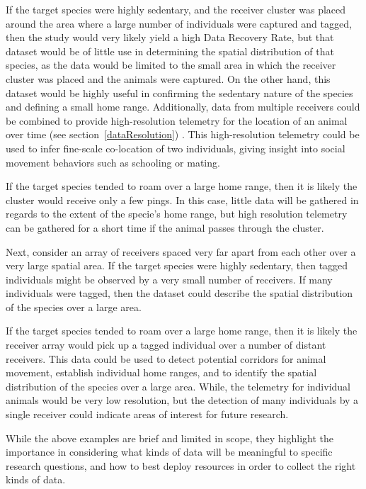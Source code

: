 If the target species were highly sedentary, and the receiver cluster was placed around the area where a large number of individuals were captured and tagged, then the study would very likely yield a high Data Recovery Rate, but that dataset would be of little use in determining the spatial distribution of that species, as the data would be limited to the small area in which the receiver cluster was placed and the animals were captured.  On the other hand, this dataset would be highly useful in confirming the sedentary nature of the species and defining a small home range.  Additionally, data from multiple receivers could be combined to provide high-resolution telemetry for the location of an animal over time (see section~\ref{dataResolution}) \cite{Heupel2006}.  This high-resolution telemetry could be used to infer fine-scale co-location of two individuals, giving insight into social movement behaviors such as schooling or mating.  

If the target species tended to roam over a large home range, then it is likely the cluster would receive only a few pings.  In this case, little data will be gathered in regards to the extent of the specie's home range, but high resolution telemetry can be gathered for a short time if the animal passes through the cluster.

Next, consider an array of receivers spaced very far apart from each other over a very large spatial area.
If the target species were highly sedentary, then tagged individuals might be observed by a very small number of receivers.  If many individuals were tagged, then the dataset could describe the spatial distribution of the species over a large area.

If the target species tended to roam over a large home range, then it is likely the receiver array would pick up a tagged individual over a number of distant receivers.  This data could be used to detect potential corridors for animal movement, establish individual home ranges, and to identify the spatial distribution of the species over a large area.  While, the telemetry for individual animals would be very low resolution, but the detection of many individuals by a single receiver could indicate areas of interest for future research.

While the above examples are brief and limited in scope, they highlight the importance in considering what kinds of data will be meaningful to specific research questions, and how to best deploy resources in order to collect the right kinds of data.
